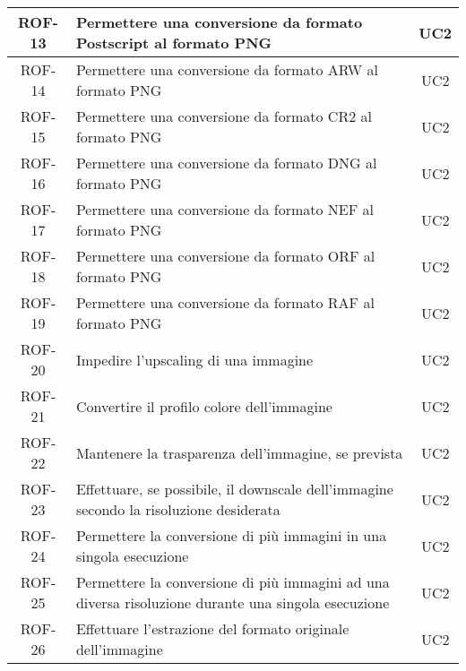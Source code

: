 \begin{table}[H]
\begin{tabularx}{\textwidth}{|c|X|c|}
        ROF-13             & Permettere una conversione da formato Postscript al formato PNG
                           & UC2
        \\
        \hline
        ROF-14             & Permettere una conversione da formato ARW al formato PNG        & UC2
        \\
        \hline
        ROF-15             & Permettere una conversione da formato CR2 al formato PNG        & UC2
        \\
        \hline
        ROF-16             & Permettere una conversione da formato DNG al formato PNG        & UC2
        \\
        \hline
        ROF-17             & Permettere una conversione da formato NEF al formato PNG        & UC2
        \\
        \hline
        ROF-18             & Permettere una conversione da formato ORF al formato PNG        & UC2
        \\
        \hline
        ROF-19             & Permettere una conversione da formato RAF al formato PNG        & UC2
        \\
        \hline
        ROF-20             & Impedire l'upscaling di una immagine
                           & UC2                                                                                 \\
        \hline
        ROF-21             & Convertire il profilo colore dell'immagine
                           & UC2                                                                                 \\
        \hline
        ROF-22             & Mantenere la trasparenza dell'immagine, se prevista
                           & UC2                                                                                 \\
        \hline
        ROF-23             & Effettuare, se possibile, il downscale
        dell'immagine secondo la risoluzione desiderata
                           & UC2                                                                                 \\
        \hline
        ROF-24             & Permettere la conversione di più immagini in una
        singola esecuzione
                           & UC2
        \\
        \hline
        ROF-25             & Permettere la conversione di più immagini ad una
        diversa risoluzione durante una singola esecuzione
                           & UC2
        \\
        \hline
        ROF-26             & Effettuare l'estrazione del formato originale dell'immagine
                           & UC2
        \\
        \hline
    \end{tabularx}
\end{table}%

